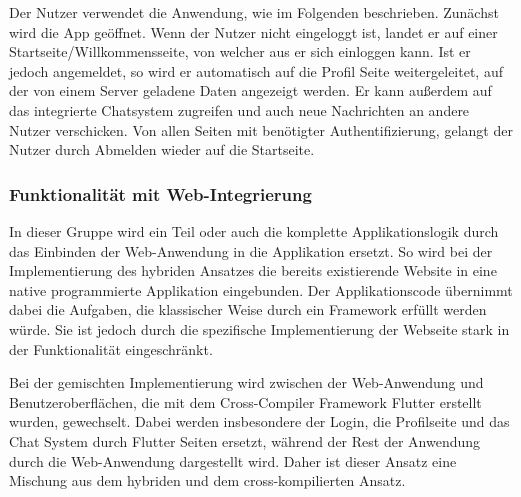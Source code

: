 Der Nutzer verwendet die Anwendung, wie im Folgenden beschrieben. Zunächst wird die App geöffnet. Wenn der Nutzer nicht eingeloggt ist, landet er auf einer Startseite/Willkommensseite, von welcher aus er sich einloggen kann. Ist er jedoch angemeldet, so wird er automatisch auf die Profil Seite weitergeleitet, auf der von einem Server geladene Daten angezeigt werden. Er kann außerdem auf das integrierte Chatsystem zugreifen und auch neue Nachrichten an andere Nutzer verschicken. Von allen Seiten mit benötigter Authentifizierung, gelangt der Nutzer durch Abmelden wieder auf die Startseite.

\subsubsection{Funktionalität mit Web-Integrierung}
In dieser Gruppe wird ein Teil oder auch die komplette Applikationslogik durch das Einbinden der Web-Anwendung in die Applikation ersetzt. So wird bei der Implementierung des hybriden Ansatzes die bereits existierende Website in eine native programmierte Applikation eingebunden. Der Applikationscode übernimmt dabei die Aufgaben, die klassischer Weise durch ein Framework erfüllt werden würde. Sie ist jedoch durch die spezifische Implementierung der Webseite stark in der Funktionalität eingeschränkt.

Bei der gemischten   Implementierung wird zwischen der Web-Anwendung und Benutzeroberflächen, die mit dem Cross-Compiler Framework Flutter erstellt wurden, gewechselt. Dabei werden insbesondere der Login, die Profilseite und das Chat System durch Flutter Seiten ersetzt, während der Rest der Anwendung durch die Web-Anwendung dargestellt wird. Daher ist dieser Ansatz eine Mischung aus dem hybriden und dem cross-kompilierten Ansatz.


